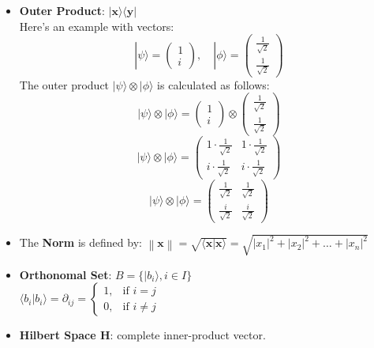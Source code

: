 \documentclass{report}
\begin{document}
\begin{itemize}
\item \textbf{Outer Product}:   $|\mathbf{x} \rangle \langle \mathbf{y}| $\\
    Here's an example with vectors:
    \[
    |\psi\rangle = \begin{pmatrix} 1 \\ i \end{pmatrix}, \quad |\phi\rangle = \begin{pmatrix} \frac{1}{\sqrt{2}} \\ \frac{1}{\sqrt{2}} \end{pmatrix}
    \]
    The outer product \(|\psi\rangle \otimes |\phi\rangle\) is calculated as follows:
    \[
    |\psi\rangle \otimes |\phi\rangle = \begin{pmatrix} 1 \\ i \end{pmatrix} \otimes \begin{pmatrix} \frac{1}{\sqrt{2}} \\ \frac{1}{\sqrt{2}} \end{pmatrix}
    \]
    \[
    |\psi\rangle \otimes |\phi\rangle = \begin{pmatrix} 1 \cdot \frac{1}{\sqrt{2}} & 1 \cdot \frac{1}{\sqrt{2}} \\ i \cdot \frac{1}{\sqrt{2}} & i \cdot \frac{1}{\sqrt{2}} \end{pmatrix}
    \]
    \[
    |\psi\rangle \otimes |\phi\rangle = \begin{pmatrix} \frac{1}{\sqrt{2}} & \frac{1}{\sqrt{2}} \\ \frac{i}{\sqrt{2}} & \frac{i}{\sqrt{2}} \end{pmatrix}
    \]
    \item The \textbf{Norm} is defined by: $\left\| \mathbf{x} \right\| = \sqrt{\langle \mathbf{x} | \mathbf{x} \rangle} = \sqrt{|x_1|^2 + |x_2|^2 + \dots + |x_n|^2}$
    \item \textbf{Orthonomal Set}: $B = \{|b_i \rangle, i \in I\}$ \\
    $\langle b_i | b_i \rangle = \partial_{ij} =
\begin{cases}
1, & \text{if } i = j \\
0, & \text{if } i \neq j
\end{cases}
$
\item \textbf{Hilbert Space H}: complete inner-product vector.
\end{itemize}
\end{document}
